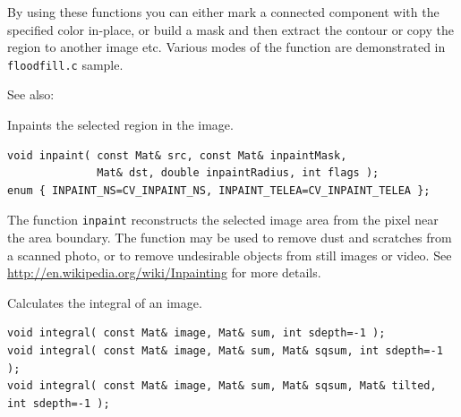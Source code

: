 By using these functions you can either mark a connected component with the specified color in-place, or build a mask and then extract the contour or copy the region to another image etc. Various modes of the function are demonstrated in \texttt{floodfill.c} sample.

See also: 


\label{inpaint}
Inpaints the selected region in the image.

\begin{lstlisting}
void inpaint( const Mat& src, const Mat& inpaintMask,
              Mat& dst, double inpaintRadius, int flags );
enum { INPAINT_NS=CV_INPAINT_NS, INPAINT_TELEA=CV_INPAINT_TELEA };
\end{lstlisting}

\begin{description}
\end{description}

The function \texttt{inpaint} reconstructs the selected image area from the pixel near the area boundary. The function may be used to remove dust and scratches from a scanned photo, or to remove undesirable objects from still images or video. See \url{http://en.wikipedia.org/wiki/Inpainting} for more details.


\label{integral}
Calculates the integral of an image.

\begin{lstlisting}
void integral( const Mat& image, Mat& sum, int sdepth=-1 );
void integral( const Mat& image, Mat& sum, Mat& sqsum, int sdepth=-1 );
void integral( const Mat& image, Mat& sum, Mat& sqsum, Mat& tilted, int sdepth=-1 );
\end{lstlisting}
\begin{description}
\end{description}

